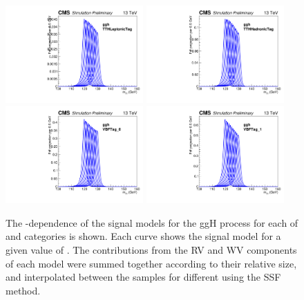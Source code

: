 \begin{figure}[ht!]
\centering
\includegraphics[width=0.47\textwidth]{modellingFigures/DCBpG/ggh_TTHLeptonicTag_fmc_interp.pdf} 
\includegraphics[width=0.47\textwidth]{modellingFigures/DCBpG/ggh_TTHHadronicTag_fmc_interp.pdf}\\ 
\includegraphics[width=0.47\textwidth]{modellingFigures/DCBpG/ggh_VBFTag_0_fmc_interp.pdf} 
\includegraphics[width=0.47\textwidth]{modellingFigures/DCBpG/ggh_VBFTag_1_fmc_interp.pdf}\\ 
\caption{The \mH-dependence of the signal models for the ggH process for each of \VBFTag and  \TTHTag categories is shown. Each curve shows the signal model for a given value of \mH. The contributions from the RV and WV components of each model were summed together according to their relative size, and interpolated between the samples for different \mH using the SSF method.}


\end{figure}
